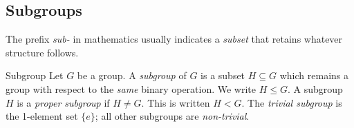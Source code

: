 \begin{exercises}
\begin{enumerate}
	 
	  
	\end{enumerate}
\end{exercises}

\clearpage



\subsection{Subgroups}\label{sec:subgroup}

The prefix \emph{sub-} in mathematics usually indicates a \emph{subset} that retains whatever structure follows.

\begin{defn}{Subgroup}{}
	Let $G$ be a group. A \emph{subgroup} of $G$ is a subset $H\subseteq G$ which remains a group with respect to the \emph{same} binary operation. We write $H\le G$.\smallbreak
	A subgroup $H$ is a \emph{proper subgroup} if $H\neq G$. This is written $H<G$.\smallbreak
	The \emph{trivial subgroup} is the 1-element set $\{e\}$; all other subgroups are \emph{non-trivial}.
\end{defn}


